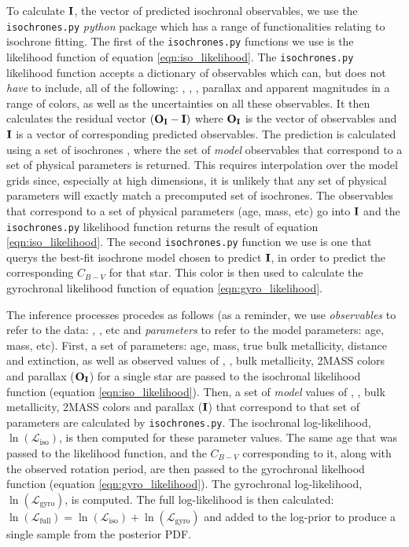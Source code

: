 To calculate ${\bf I}$, the vector of predicted isochronal observables, we use
the {\tt isochrones.py} {\it python} package which has a range of
functionalities relating to isochrone fitting.
The first of the {\tt isochrones.py} functions we use is the likelihood
function of equation \ref{eqn:iso_likelihood}.
The {\tt isochrones.py} likelihood function accepts a dictionary of
observables which can, but does not {\it have} to include, all of the
following: \teff, \logg, \feh, parallax and apparent magnitudes in a range of
colors, as well as the uncertainties on all these observables.
It then calculates the residual vector $({\bf O_I} - {\bf I})$ where ${\bf
O_I}$ is the vector of observables and ${\bf I}$ is a vector of corresponding
predicted observables.
The prediction is calculated using a set of isochrones \citep[we use the MIST
models][]{choi}, where the set of {\it model} observables that correspond to a
set of physical parameters is returned.
This requires interpolation over the model grids since, especially at high
dimensions, it is unlikely that any set of physical parameters will exactly
match a precomputed set of isochrones.
The observables that correspond to a set of physical parameters (age, mass,
etc) go into ${\bf I}$ and the {\tt isochrones.py} likelihood function returns
the result of equation \ref{eqn:iso_likelihood}.
The second {\tt isochrones.py} function we use is one that querys the best-fit
isochrone model chosen to predict ${\bf I}$, in order to predict the
corresponding $C_{B-V}$ for that star.
This color is then used to calculate the gyrochronal likelihood function of
equation \ref{eqn:gyro_likelihood}.

The inference processes procedes as follows (as a reminder, we use {\it
observables} to refer to the data: \teff, \logg, etc and {\it parameters} to
refer to the model parameters: age, mass, etc).
First, a set of parameters: age, mass, true bulk metallicity, distance and
extinction, as well as observed values of \teff, \logg, bulk metallicity,
2MASS colors and parallax (${\bf O_I}$) for a single star are passed to the
isochronal likelihood function (equation \ref{eqn:iso_likelihood}).
Then, a set of {\it model} values of \teff, \logg, bulk metallicity, 2MASS
colors and parallax (${\bf I}$) that correspond to that set of parameters are
calculated by {\tt isochrones.py}.
The isochronal log-likelihood, $\ln(\mathcal{L}_{\mathrm{iso}})$, is then
computed for these parameter values.
The same age that was passed to the likelihood function, and the $C_{B-V}$
corresponding to it, along with the observed rotation period, are then passed
to the gyrochronal likelhood function (equation \ref{eqn:gyro_likelihood}).
The gyrochronal log-likelihood, $\ln(\mathcal{L}_{\mathrm{gyro}})$, is
computed.
The full log-likelihood is then calculated: $\ln(\mathcal{L}_{\mathrm{full}})
= \ln(\mathcal{L}_{\mathrm{iso}}) + \ln(\mathcal{L}_{\mathrm{gyro}})$ and
added to the log-prior to produce a single sample from the posterior PDF.

